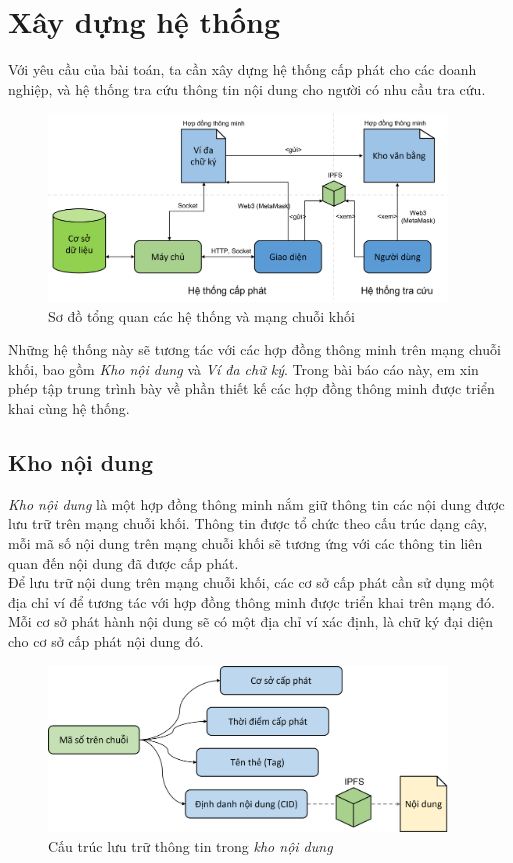 \newpage
\section{Xây dựng hệ thống}

Với yêu cầu của bài toán, ta cần xây dựng hệ thống cấp phát cho các doanh nghiệp, và hệ thống tra cứu thông tin nội dung cho người có nhu cầu tra cứu.\\

\begin{figure}[ht]
    \centering
    \includegraphics[width=400px]{anh/giai-phap/tong-quan-he-thong.png}
    \caption{Sơ đồ tổng quan các hệ thống và mạng chuỗi khối}
    \label{images/system-overview}
\end{figure}

Những hệ thống này sẽ tương tác với các hợp đồng thông minh trên mạng chuỗi khối, bao gồm \textit{Kho nội dung} và \textit{Ví đa chữ ký}. Trong bài báo cáo này, em xin phép tập trung trình bày về phần thiết kế các hợp đồng thông minh được triển khai cùng hệ thống.


\subsection{Kho nội dung}
\textit{Kho nội dung} là một hợp đồng thông minh nắm giữ thông tin các nội dung được lưu trữ trên mạng chuỗi khối. Thông tin được tổ chức theo cấu trúc dạng cây, mỗi mã số nội dung trên mạng chuỗi khối sẽ tương ứng với các thông tin liên quan đến nội dung đã được cấp phát.\\

Để lưu trữ nội dung trên mạng chuỗi khối, các cơ sở cấp phát cần sử dụng một địa chỉ ví để tương tác với hợp đồng thông minh được triển khai trên mạng đó. Mỗi cơ sở phát hành nội dung sẽ có một địa chỉ ví xác định, là chữ ký đại diện cho cơ sở cấp phát nội dung đó.\\

\begin{figure}[!ht]
    \centering
    \includegraphics[width=400px]{anh/giai-phap/cau-truc-du-lieu.png}
    \caption{Cấu trúc lưu trữ thông tin trong \textit{kho nội dung}}
\end{figure}

